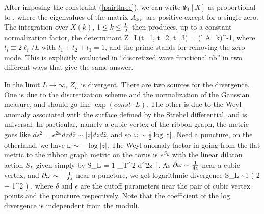 \documentclass[12pt]{article}
\begin{document}
After imposing the constraint (\ref{pairthree}), we can write $\Psi_1[X]$ as proportional to
\ie
\exp\left[ - \sum_{k,\ell=1}^{L\over 2} A_{k\ell} X(k) X(\ell) \right],
\fe
where the eigenvalues of the matrix $A_{k\ell}$ are positive except for a single zero. The integration over $X(k)$, $1\leq k\leq {L\over 2}$ then produces, up to a constant normalization factor, the determinant
\ie\label{detprime}
Z_L(t_1, t_2, t_3) = ({\det}' A_{k\ell})^{-{1}},
\fe
where $t_i\equiv 2\ell_i /L$ with $t_1+t_2+t_3=1$, and the prime stands for removing the zero mode. This is explicitly evaluated in ``discretized wave functional.nb'' in two different ways that give the same answer.

In the limit $L\to \infty$, $Z_L$ is divergent. There are two sources for the divergence. One is due to the discretization scheme and the normalization of the Gaussian measure, and should go like $\exp(const\cdot L)$. The other is due to the Weyl anomaly associated with the surface defined by the Strebel differential, and is universal. In particular, namely a cubic vertex of the ribbon graph, the metric goes like $ds^2 =e^{2\omega} dz d\bar z \sim |z| dz d\bar z$, and so $\omega \sim {1\over 2} \log|z|$. Need a puncture, on the otherhand, we have $\omega \sim - \log|z|$. The Weyl anomaly factor in going from the flat metric to the ribbon graph metric on the torus is $e^{S_L}$ with the linear dilaton action $S_L$ given simply by
\ie\label{slact}
S_L = {1\pi} \int_{T^2} d^2z \,\partial\omega \bar\partial\omega.
\fe
As $\partial \omega \sim {1\over 4z}$ near a cubic vertex, and $\partial\omega\sim - {1\over 2z}$ near a puncture, we get logarithmic divergence
\ie
S_L \sim  {1\pi} \cdot {2\cdot 2\pi}  \left( 2 \log {1\over \delta} + {1^2} \log {1\over \epsilon} \right)  , %
\fe
where $\delta$ and $\epsilon$ are the cutoff parameters near the pair of cubic vertex points and the puncture respectively. Note that the coefficient of the log divergence is independent from the moduli.

\end{document}
